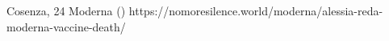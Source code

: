           {Cosenza, }
          {24}
          {Moderna}
          {}
          {
             ()
          }
          {https://nomoresilence.world/moderna/alessia-reda-moderna-vaccine-death/}



